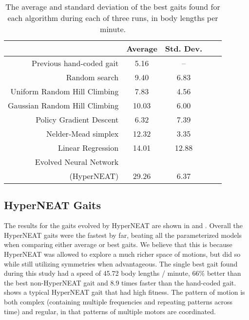 \begin{table}
\begin{center}
\begin{tabular}{|r|c|c|c||c|}
\hline
                                         & Average & Std. Dev. \\
\hline                                    
\hline                                    
Previous hand-coded gait                 & 5.16   &   --     \\
\hline
Random search                            & 9.40   &   6.83   \\
\hline
Uniform Random Hill Climbing             & 7.83   &   4.56   \\
\hline
Gaussian Random Hill Climbing            & 10.03  &   6.00   \\
\hline
Policy Gradient Descent                  & 6.32   &   7.39   \\
\hline
Nelder-Mead simplex                      & 12.32  &   3.35   \\
\hline
Linear Regression                        & 14.01  &  12.88   \\
\hline
Evolved Neural Network              &        &          \\
(HyperNEAT)                              & 29.26  &   6.37   \\
\hline
\end{tabular}
\caption{The average and standard deviation of the best gaits found
  for each algorithm during each of three runs, in body lengths per
  minute.}  
\end{center}
\end{table}







\subsection{HyperNEAT Gaits}

The results for the gaits evolved by HyperNEAT are shown in
 and .  Overall the HyperNEAT gaits
were the fastest by far, beating all the parameterized models when
comparing either average or best gaits.  We believe that this is
because HyperNEAT was allowed to explore a much richer space of
motions, but did so while still utilizing symmetries when
advantageous.  The single best gait found during this study had a
speed of 45.72 body lengths / minute, 66\% better than the best
non-HyperNEAT gait and 8.9 times faster than the hand-coded gait.
 shows a typical
HyperNEAT gait that had high fitness.  The pattern of motion is both
complex (containing multiple frequencies and repeating patterns across
time) and regular, in that patterns of multiple motors are
coordinated.

